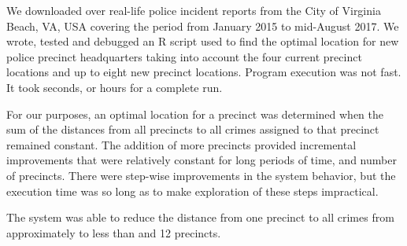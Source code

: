 We downloaded over  real-life police incident reports from the City of Virginia Beach, VA, USA covering the period from January 2015 to mid-August 2017.  We wrote, tested and debugged an R script used to find the optimal location for new police precinct headquarters taking into account the four current precinct locations and up to eight new precinct locations.  Program execution was not fast.  It took  seconds, or  hours for a complete run.

For our purposes, an optimal location for a precinct was determined when the sum of the distances from all precincts to all crimes assigned to that precinct remained constant.  The addition of more precincts provided incremental improvements that were relatively constant for long periods of time, and number of precincts.  There were step-wise improvements in the system behavior, but the execution time was so long as to make exploration of these steps impractical.

The system was able to reduce the distance from one precinct to all crimes from approximately  to less than  and 12 precincts.

